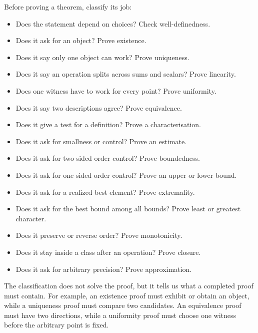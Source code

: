 Before proving a theorem, classify its job:
\begin{itemize}
  \item Does the statement depend on choices? Check well-definedness.
  \item Does it ask for an object? Prove existence.
  \item Does it say only one object can work? Prove uniqueness.
  \item Does it say an operation splits across sums and scalars? Prove
        linearity.
  \item Does one witness have to work for every point? Prove uniformity.
  \item Does it say two descriptions agree? Prove equivalence.
  \item Does it give a test for a definition? Prove a characterisation.
  \item Does it ask for smallness or control? Prove an estimate.
  \item Does it ask for two-sided order control? Prove boundedness.
  \item Does it ask for one-sided order control? Prove an upper or lower
        bound.
  \item Does it ask for a realized best element? Prove extremality.
  \item Does it ask for the best bound among all bounds? Prove least or
        greatest character.
  \item Does it preserve or reverse order? Prove monotonicity.
  \item Does it stay inside a class after an operation? Prove closure.
  \item Does it ask for arbitrary precision? Prove approximation.
\end{itemize}

\begin{remark}
The classification does not solve the proof, but it tells us what a completed
proof must contain. For example, an existence proof must exhibit or obtain an
object, while a uniqueness proof must compare two candidates. An equivalence
proof must have two directions, while a uniformity proof must choose one
witness before the arbitrary point is fixed.
\end{remark}

\endgroup
